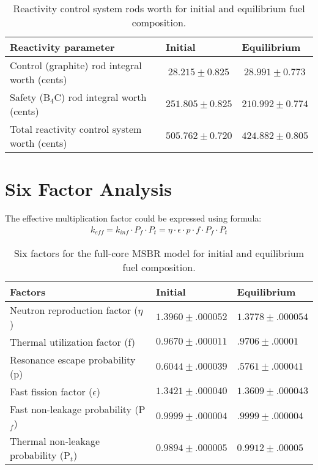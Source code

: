 \begin{table}[hb!]
  \centering
  \caption{Reactivity control system rods worth for initial and equilibrium fuel composition.}
\begin{tabular}{| m{} | m{} | m{} |} \hline
\qquad\qquad Reactivity parameter  & \quad Initial      & \enspace Equilibrium      \\[3pt] \hline   
Control (graphite) rod integral worth (cents)               & $\ 28.215\pm0.825$   & $\ 28.991\pm0.773$ \\[3pt]  \hline 
Safety (B$_4$C) rod integral worth (cents)                  & $251.805\pm0.825$    & $210.992\pm0.774$  \\[3pt]  \hline
Total reactivity control system worth (cents)      & $505.762\pm0.720$    & $424.882\pm0.805$ \\[3pt] \hline
\end{tabular}
  \label{tab:rod_worth}
\end{table}

\section{Six Factor Analysis}
The effective multiplication factor could be expressed using formula:
\begin{align*}
k_{eff} = k_{inf} \cdot P_f \cdot P_t = \eta \cdot \epsilon \cdot p \cdot f \cdot P_f \cdot P_t
\end{align*}

\begin{table}[ht!]
  \centering
  \caption{Six factors for the full-core \gls{MSBR} model for initial and equilibrium fuel composition.}
\begin{tabular}{| m{} | m{} | m{} |} \hline
	   \qquad\qquad\qquad Factors  & \qquad\qquad Initial      & \qquad Equilibrium   \\ [3pt]\hline   
Neutron reproduction factor ($\eta$)     & $1.3960\pm.000052$     & $1.3778\pm.000054$ \\ [3pt] \hline
Thermal utilization factor (f)           & $0.9670\pm.000011$     & $.9706\pm.00001$    \\ [3pt] \hline
Resonance escape probability (p)         & $0.6044\pm.000039$     & $.5761\pm.000041$    \\ [3pt] \hline
Fast fission factor ($\epsilon$)         & $1.3421\pm.000040$     & $1.3609\pm.000043$    \\ [3pt] \hline
Fast non-leakage probability (P$_f$)     & $0.9999\pm.000004$     & $.9999\pm.000004$    \\ [3pt] \hline
Thermal non-leakage probability (P$_t$)  & $0.9894\pm.000005$     & $0.9912\pm.00005$    \\ [3pt] \hline
\end{tabular}
  \label{tab:six_factor}
\end{table}

